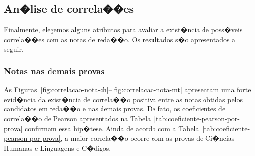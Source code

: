 \documentclass[12pt]{article}
\newcommand{\reftab}[1]{Tabela~\ref{tab:#1}}
\begin{document}
\subsection{An�lise de correla��es}
Finalmente, elegemos alguns atributos para avaliar a exist�ncia de poss�veis correla��es com as notas de reda��o.
Os resultados s�o apresentados a seguir.

\subsubsection{Notas nas demais provas}
As Figuras~\ref{fig:correlacao-nota-ch}--\ref{fig:correlacao-nota-mt} apresentam uma forte evid�ncia da exist�ncia de correla��o positiva entre as notas obtidas pelos candidatos em reda��o e nas demais provas.
De fato, os coeficientes de correla��o de Pearson apresentados na \reftab{coeficiente-pearson-por-prova} confirmam essa hip�tese.
Ainda de acordo com a \reftab{coeficiente-pearson-por-prova}, a maior correla��o ocorre com as provas de Ci�ncias Humanas e Linguagens e C�digos.
\end{document}

